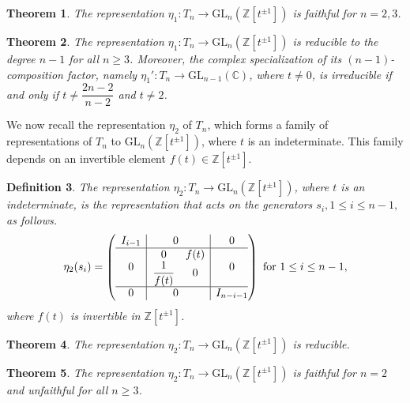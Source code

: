\documentclass[reqno]{amsart}
\newtheorem{theorem}{Theorem}
\newtheorem{definition}[theorem]{Definition}
\begin{document}
\begin{theorem}\cite{Nasser2025}
The representation $\eta_1: T_n \longrightarrow \mathrm{GL}_n(\mathbb{Z}[t^{\pm 1}])$ is faithful for $n=2,3$.
\end{theorem}
 
\begin{theorem} \cite{Nasser2025}
The representation $\eta_1: T_n \longrightarrow \mathrm{GL}_n(\mathbb{Z}[t^{\pm 1}])$ is reducible to the degree $n-1$ for all $n\geq 3$. Moreover, the complex specialization of its $(n-1)$-composition factor, namely $\eta_1': T_n \longrightarrow \mathrm{GL}_{n-1}(\mathbb{C})$, where $t\neq 0$, is irreducible if and only if $t\neq \dfrac{2n-2}{n-2}$ and $t\neq 2$.
\end{theorem}

We now recall the representation $\eta_2$ of $T_n$, which forms a family of representations of $T_n$ to $\mathrm{GL}_n(\mathbb{Z}[t^{\pm 1}])$, where $t$ is an indeterminate. This family depends on an invertible element $f(t) \in \mathbb{Z}[t^{\pm 1}]$.

\begin{definition}\cite{Nasser2025} \label{defeta2}
The representation $\eta_2: T_n \longrightarrow \mathrm{GL}_n(\mathbb{Z}[t^{\pm 1}])$, where $t$ is an indeterminate, is the representation that acts on the generators $s_i, 1\leq i \leq n-1,$ as follows.
$$\eta_2(s_i) = \left( \begin{array}{c|@{}c|c@{}}
   \begin{matrix}
     I_{i-1} 
   \end{matrix} 
      & 0 & 0 \\
      \hline
    0 &\hspace{0.2cm} \begin{matrix}
   	0 & f(t)\\
   	\dfrac{1}{f(t)} & 0\\
\end{matrix}  & 0  \\
\hline
0 & 0 & I_{n-i-1}
\end{array} \right) \text{ for } 1\leq i \leq n-1,$$
where $f(t)$ is invertible in $ \mathbb{Z}[t^{\pm 1}]$.
\end{definition}

\begin{theorem} \cite{Nasser2025}
The representation $\eta_2: T_n \longrightarrow \mathrm{GL}_n(\mathbb{Z}[t^{\pm 1}])$ is reducible. 
\end{theorem}

\begin{theorem} \cite{Nasser2025}
The representation $\eta_2: T_n \longrightarrow \mathrm{GL}_n(\mathbb{Z}[t^{\pm 1}])$ is faithful for $n=2$ and unfaithful for all $n\geq 3$.
\end{theorem}
\end{document}

